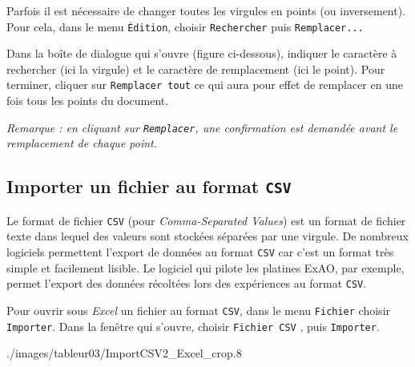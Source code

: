 Parfois il est nécessaire de changer toutes les virgules en points (ou inversement). Pour cela, dans le menu \texttt{Édition}, choisir \texttt{Rechercher} puis \texttt{Remplacer...}


Dans la boîte de dialogue qui s'ouvre (figure ci-dessous), indiquer le caractère à rechercher  (ici la virgule) et le caractère de remplacement  (ici le point). Pour terminer, cliquer sur \texttt{Remplacer tout}  ce qui aura pour effet de remplacer en une fois tous les points du document.

\emph{Remarque : en cliquant sur \texttt{Remplacer}, une confirmation est demandée avant le remplacement de chaque point.}



\subsection{Importer un fichier au format \texttt{CSV}}\label{Calc3fichierCSV}

Le format de fichier \texttt{CSV} (pour \emph{Comma-Separated Values}) est un format de fichier texte dans lequel des valeurs sont stockées séparées par une virgule. De nombreux logiciels permettent l'export de données au format \texttt{CSV} car c'est un format très simple et facilement lisible. Le logiciel qui pilote les platines ExAO, par exemple, permet l'export des données récoltées lors des expériences au format \texttt{CSV}.

\vspace{1em}

Pour ouvrir sous \emph{Excel} un fichier au format \texttt{CSV}, dans le menu \texttt{Fichier}  choisir \texttt{Importer}.  Dans la fenêtre qui s'ouvre, choisir \texttt{Fichier CSV} , puis \texttt{Importer}. 

%
{./images/tableur03/ImportCSV2_Excel_crop}{.8\textwidth}

